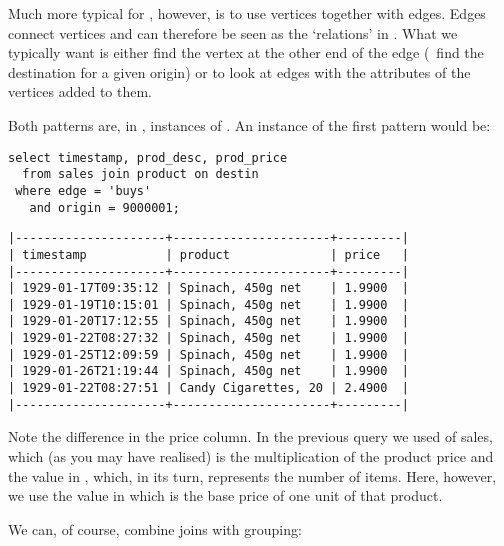 
Much more typical for \nowdb, however,
is to use vertices together with edges. Edges connect vertices
and can therefore be seen as the `relations' in \nowdb.
What we typically want is either find the vertex
at the other end of the edge (\eg\ find the destination
for a given origin) or to look at edges with the attributes
of the vertices added to them.

Both patterns are, in \sql, instances of .
An instance of the first pattern would be:

\begin{sqlcode}
\begin{lstlisting}
select timestamp, prod_desc, prod_price
  from sales join product on destin
 where edge = 'buys'
   and origin = 9000001;
\end{lstlisting}
\end{sqlcode}

\begin{minipage}{\textwidth}
\begin{verbatim}
|---------------------+----------------------+---------|
| timestamp           | product              | price   |
|---------------------+----------------------+---------|
| 1929-01-17T09:35:12 | Spinach, 450g net    | 1.9900  |
| 1929-01-19T10:15:01 | Spinach, 450g net    | 1.9900  |
| 1929-01-20T17:12:55 | Spinach, 450g net    | 1.9900  |
| 1929-01-22T08:27:32 | Spinach, 450g net    | 1.9900  |
| 1929-01-25T12:09:59 | Spinach, 450g net    | 1.9900  |
| 1929-01-26T21:19:44 | Spinach, 450g net    | 1.9900  |
| 1929-01-22T08:27:51 | Candy Cigarettes, 20 | 2.4900  |
|---------------------+----------------------+---------|
\end{verbatim}
\end{minipage}

Note the difference in the price column.
In the previous query we used  of sales,
which (as you may have realised)
is the multiplication of the product price and the value
in , which, in its turn,
represents the number of items.
Here, however, we use the value in 
which is the base price of one unit of that product.

We can, of course, combine joins with grouping:


